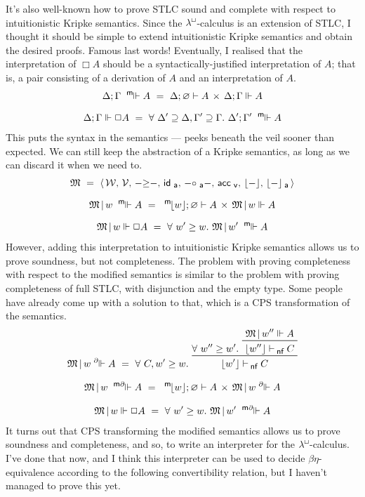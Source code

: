 \documentclass{entcs}
\newcommand{\lambdabox}{\lambda^{\mkern-1mu\sq\mkern-2mu}}
\renewcommand{\:}{\mathrel{:}}
\renewcommand{\;}{\mathbin{;}}
\newcommand{\binop}[1]{-\mathord{#1}-}
\let\oldforall\forall
\renewcommand{\forall}{\oldforall\,}
\newcommand{\tsf}[1]{\textsf{\upshape{#1}}}
\newcommand{\stsf}[1]{\tsf{\small{#1}}}
\newcommand{\sq}{\Box}
\renewcommand{\O}{\varnothing}
\renewcommand{\e}{\mathrel{\vdash}}
\newcommand{\enf}{\mathrel{\vdash_{\mkern-2mu\stsf{nf}}}}
\renewcommand{\geq}{\mathrel{\supseteq}}
\newcommand{\M}{\mathfrak{M}}
\newcommand{\W}{\mathcal{W}}
\newcommand{\V}{\mathcal{V}}
\newcommand{\ida}{\operatorname{\tsf{id}_{\stsf{a}}}}
\newcommand{\compa}{\mathrel{\circ_{\stsf{a}}}}
\newcommand{\accv}{\operatorname{\tsf{acc}_{\stsf{v}}}}
\newcommand{\peek}[1]{\mathopen{\lfloor}{#1}\mathclose{\rfloor}}
\newcommand{\peeka}[1]{\mathopen{\lfloor}{#1}\mathclose{\rfloor_{\mkern-2mu\stsf{a}}}}
\newcommand{\mpeek}[1]{\mathopen{^{\stsf{m}\mkern-3mu}\lfloor}{#1}\mathclose{\rfloor}}
\newcommand{\ee}{\mathrel{\Vdash}}
\newcommand{\mee}{\mathrel{^{\stsf{m}\mkern-7mu}\Vdash}}
\newcommand{\dee}{\mathrel{^{\partial\mkern-7mu}\Vdash}}
\newcommand{\mdee}{\mathrel{^{\stsf{m}\partial\mkern-7mu}\Vdash}}
\begin{document}
It's also well-known how to prove STLC sound and complete with respect to intuitionistic Kripke semantics.  Since the $\lambdabox$-calculus is an extension of STLC, I thought it should be simple to extend intuitionistic Kripke semantics and obtain the desired proofs.  Famous last words!  Eventually, I realised that the interpretation of $\sq A$ should be a syntactically-justified interpretation of $A$; that is, a pair consisting of a derivation of $A$ and an interpretation of $A$.
\begin{gather*}
  \Delta; \Gamma \mee A\ =\ \Delta; \O \e A\,\times\,\Delta; \Gamma \ee A\\[0.5\baselineskip]
  \Delta; \Gamma \ee \sq A\ =\ \forall \Delta' \geq \Delta, \Gamma' \geq \Gamma.\ \Delta'; \Gamma' \mee A
\end{gather*}
This puts the syntax in the semantics --- peeks beneath the veil sooner than expected.  We can still keep the abstraction of a Kripke semantics, as long as we can discard it when we need to.
\begin{gather*}
  \M\ =\ \langle\,\W,\,\V,\,\binop{\ge},\,\ida,\,\binop{\compa},\,\accv,\,\peek{-},\,\peeka{-}\,\rangle\\[0.5\baselineskip]
  \M\,|\,w \mee A\ =\ \mpeek{w}; \O \e A\,\times\,\M\,|\,w \ee A\\[0.5\baselineskip]
  \M\,|\,w \ee \sq A\ =\ \forall w' \ge w.\ \M\,|\,w' \mee A
\end{gather*}
However, adding this interpretation to intuitionistic Kripke semantics allows us to prove soundness, but not completeness.  The problem with proving completeness with respect to the modified semantics is similar to the problem with proving completeness of full STLC, with disjunction and the empty type.  Some people have already come up with a solution to that, which is a CPS transformation of the semantics.
\begin{gather*}
  \M\,|\,w \dee A\ =\ \forall C, w' \ge w.\ \prftree{\forall w'' \ge w'.\ \prftree{\M\,|\,w'' \ee A}{\lfloor w'' \rfloor \enf C}}{\lfloor w' \rfloor \enf C}\\[0.5\baselineskip]
  \M\,|\,w \mdee A\ =\ \mpeek{w}; \O \e A\,\times\,\M\,|\,w \dee A\\[0.5\baselineskip]
  \M\,|\,w \ee \sq A\ =\ \forall w' \ge w.\ \M\,|\,w' \mdee A
\end{gather*}
It turns out that CPS transforming the modified semantics allows us to prove soundness and completeness, and so, to write an interpreter for the $\lambdabox$-calculus.  I've done that now, and I think this interpreter can be used to decide $\beta\eta$-equivalence according to the following convertibility relation, but I haven't managed to prove this yet.
\end{document}
